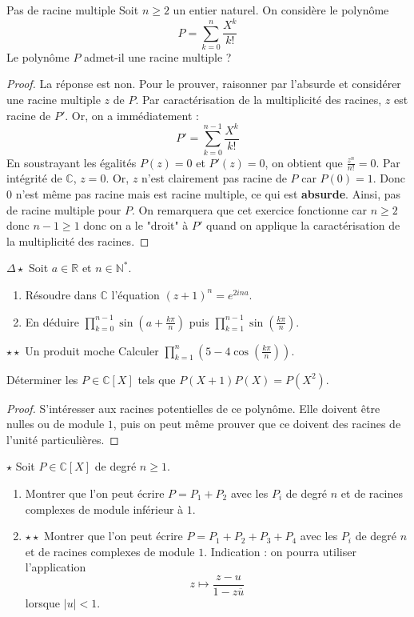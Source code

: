\documentclass[french,a4paper]{article}
\newcommand{\N}{\mathbb{N}}
\newcommand{\R}{\mathbb{R}}
\newcommand{\C}{\mathbb{C}}
\newcommand{\st}{^*}
\theoremstyle{plain}
\theoremstyle{definition}
\theoremstyle{remark}
\begin{document}
\begin{ex}[Morlot]{Pas de racine multiple}
	Soit $n \ge 2$ un entier naturel. On considère le polynôme $$P = \sum_{k=0}^{n}\frac{X^k}{k!}$$ Le polynôme $P$ admet-il une racine multiple ?
\end{ex}
\begin{proof}
	La réponse est non. Pour le prouver, raisonner par l'absurde et considérer une racine multiple $z$ de $P$. Par caractérisation de la multiplicité des racines, $z$ est racine de $P'$. Or, on a immédiatement : $$P'=\sum_{k=0}^{n-1}\frac{X^k}{k!}$$ En soustrayant les égalités $P(z)=0$ et $P'(z)=0$, on obtient que $\displaystyle \frac{z^n}{n!}=0$. Par intégrité de $\C$, $z=0$. Or, $z$ n'est clairement pas racine de $P$ car $P(0)=1$. Donc 0 n'est même pas racine mais est racine multiple, ce qui est \textbf{absurde}. Ainsi, pas de racine multiple pour $P$. On remarquera que cet exercice fonctionne car $n \ge 2$ donc $n-1 \ge 1$ donc on a le "droit" à $P'$ quand on applique la caractérisation de la multiplicité des racines.
\end{proof}

\begin{ex}[Moulin.14]{$\Delta\star$}
	Soit $a\in\R$ et $n\in\N\st$.
	\begin{enumerate}
		\item Résoudre dans $\C$ l'équation $(z+1)^n=e^{2ina}$.
		\item En déduire $\displaystyle\prod_{k=0}^{n-1}\sin\left(a+\frac{k\pi}{n}\right)$ puis $\displaystyle\prod_{k=1}^{n-1}\sin\left(\frac{k\pi}{n}\right)$.
	\end{enumerate}
\end{ex}

\begin{ex}[Moulin.15]{$\star\star$ Un produit moche}
	Calculer $\displaystyle\prod_{k=1}^{n}\left(5-4\cos\left(\frac{k\pi}{n}\right)\right)$.
\end{ex}

\begin{ex}[Moulin.16]{}
	Déterminer les $P\in\C[X]$ tels que $P(X+1)P(X)=P(X^2)$.
\end{ex}
\begin{proof}
	S'intéresser aux racines potentielles de ce polynôme. Elle doivent être nulles ou de module $1$, puis on peut même prouver que ce doivent des racines de l'unité particulières.
\end{proof}

\begin{ex}[Moulin.17]{$\star$}
	Soit $P\in\C[X]$ de degré $n\geqslant 1$.
	\begin{enumerate}
		\item Montrer que l'on peut écrire $P=P_1+P_2$ avec les $P_i$ de degré $n$ et de racines complexes de module inférieur à $1$.
		\item $\star\star$ Montrer que l'on peut écrire $P=P_1+P_2+P_3+P_4$ avec les $P_i$ de degré $n$ et de racines complexes de module $1$. Indication : on pourra utiliser l'application $$z\mapsto\frac{z-u}{1-z\overline{u}}$$ lorsque $\lvert u\rvert <1$.
	\end{enumerate}
\end{ex}
\end{document}
